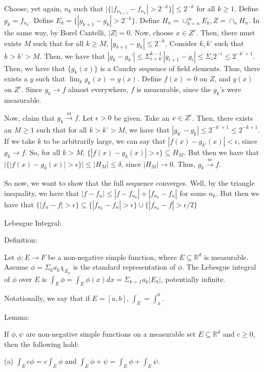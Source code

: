 \documentclass[10pt]{article}
\begin{document}
Choose, yet again, $n_k$ such that $| \{ |f_{n_{k+1}} - f_{n_k} |> 2^{-k} \} | \leq 2^{-k}$ for all $k \geq 1$. Define $g_k = f_{n_k}$. Define $E_k = \{ | g_{k+1} - g_{k}| > 2^{-k} \}$. Define $H_n = \cup_{k=n}^\infty E_k, Z = \cap_n H_n$. In the same way, by Borel Cantelli, $|Z| = 0$. Now, choose $x \in Z^c$. Then, there must exists $M$ such that for all $k \geq M$, $|g_{k+1} - g_k| \leq 2^{-k}$. Consider $k,k’$ such that $k > k’ > M$. Then, we have that $|g_k - g_k’| \leq \Sigma_{i=k’}^{k-1} | g_{i+1} - g_i | \leq \Sigma_i 2^{-i} \leq 2^{-k’+1}$. Then, we have that $\{ g_k(x) \}$ is a Cauchy sequence of field elements. Thus, there exists a $y$ such that $\lim_k g_k(x) = y(x)$. Define $f(x) = 0$ on $Z$, and $y(x)$ on $Z^c$. Since $g_k \to f$ almost everywhere, $f$ is measurable, since the $g_k$’s were measurable.

Now, claim that $g_k \xrightarrow[]{m} f$. Let $\epsilon > 0$ be given. Take an $x \in Z^c$. Then, there exists an $M \geq 1$ such that for all $k > k’ > M$, we have that $|g_{k’} - g_{k} | \leq 2^{-k’+1} \leq 2^{-k + 1}$. If we take $k$ to be arbitrarily large, we can say that $|f(x) - g_{k’}(x) | < \epsilon$, since $g_k \to f$. So, for all $k > M$, $\{ | f(x) - g_k(x) | > \epsilon \} \subseteq H_M$. But then we have that $|\{ | f(x) - g_k(x) | > \epsilon \} | \leq |H_M| \leq \delta$, since $|H_M| \to 0$. Thus, $g_k \xrightarrow[]{m} f$. 

So now, we want to show that the full sequence converges. Well, by the triangle inequality, we have that $|f - f_n| \leq |f - f_{n_k}| + |f_{n_k} - f_n|$ for some $n_k$. But then we have that $\{ |f_n - f| > \epsilon \} \subseteq \{ |f_{n_k} - f_n| > \epsilon \}  \cup \{ |f_{n_k} - f| > \epsilon/2 \}$ 

Lebesgue Integral:

Definition:

Let $\phi: E \to F$ be a non-negative simple function, where $E \subseteq \mathbb{R}^d$ is measurable. Assume $\phi = \Sigma_k a_k \chi_{E_k}$ is the standard representation of $\phi$. The Lebesgue integral of $\phi$ over $E$ is $\int_E \phi = \int_E \phi(x)  dx = \Sigma_{k=1} a_k |E_k|$, potentially infinite.

Notationally, we say that if $E = [a,b]$, $\int_E = \int_a^b$.  

Lemma:

If $\phi, \psi$ are non-negative simple functions on a measurable set $E \subseteq \mathbb{R}^d$ and $c \geq 0$, then the following hold:

(a) $\int_E c \phi = c \int_E \phi$ and $\int_E \phi + \psi = \int_E \phi + \int_E \psi$.
\end{document}
